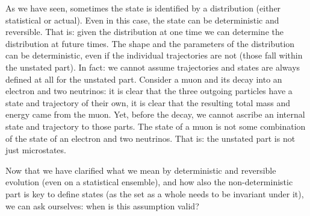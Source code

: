\documentclass[aps,pra,10pt,twocolumn,floatfix,nofootinbib]{revtex4-1}
\theoremstyle{definition}
\begin{document}
As we have seen, sometimes the state is identified by a distribution (either statistical or actual). Even in this case, the state can be deterministic and reversible. That is: given the distribution at one time we can determine the distribution at future times. The shape and the parameters of the distribution can be deterministic, even if the individual trajectories are not (those fall within the unstated part). In fact: we cannot assume trajectories and states are always defined at all for the unstated part. Consider a muon and its decay into an electron and two neutrinos: it is clear that the three outgoing particles have a state and trajectory of their own, it is clear that the resulting total mass and energy came from the muon. Yet, before the decay, we cannot ascribe an internal state and trajectory to those parts. The state of a muon is not some combination of the state of an electron and two neutrinos. That is: the unstated part is not just microstates.

Now that we have clarified what we mean by deterministic and reversible evolution (even on a statistical ensemble), and how also the non-deterministic part is key to define states (as the set as a whole needs to be invariant under it), we can ask ourselves: when is this assumption valid?
\end{document}
